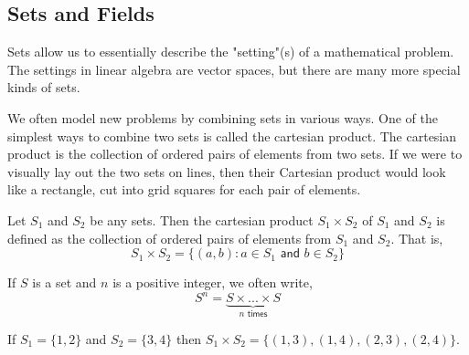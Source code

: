 \subsection{Sets and Fields}

Sets allow us to essentially describe the "setting"(s) of a mathematical problem. The settings in linear algebra are vector spaces, but there are many more special kinds of sets. 

We often model new problems by combining sets in various ways. One of the simplest ways to combine two sets is called the cartesian product. The cartesian product is the collection of ordered pairs of elements from two sets. If we were to visually lay out the two sets on lines, then their Cartesian product would look like a rectangle, cut into grid squares for each pair of elements.

\begin{defn}
Let $S_1$ and $S_2$ be any sets. Then the cartesian product $S_1 \times S_2$ of $S_1$ and $S_2$ is defined as the collection of ordered pairs of elements from $S_1$ and $S_2$. That is,
\[S_1 \times S_2 = \{(a,b) : a \in S_1 \textsf{ and } b \in S_2 \}\]

If $S$ is a set and $n$ is a positive integer, we often write,
\[S^n = \underbrace{S \times ... \times S}_{n\textsf{ times}}\]
\end{defn}

\begin{example}If $S_1 = \{1,2\}$ and $S_2 = \{3,4\}$ then $S_1\times S_2 = \{(1,3), (1,4), (2,3), (2,4)\}$.\end{example}


